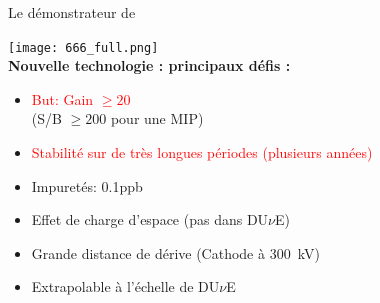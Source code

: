    \begin{frame}{Le démonstrateur de \SSS{}}
    	\begin{scriptsize}
                \centering
    			\texttt{[image: 666\_full.png]}\\
    			\vfill
    			\textbf{Nouvelle technologie : principaux défis :}\\
    			\begin{minipage}{0.32\textwidth}
    				\begin{itemize}
    					\item \textcolor{red}{But: Gain $\geq 20$} \\(S/B $\geq 200$ pour une MIP)
    					\item \textcolor{red}{Stabilité sur de très longues périodes (plusieurs années)}
    				\end{itemize}
    			\end{minipage}\hfill
    			\begin{minipage}{0.32\textwidth}
    				\begin{itemize}
    					\item Impuretés: 0.1\;ppb
    					\item Effet de charge d'espace
    					(pas dans DU$\nu$E)
    				\end{itemize}
	    		\end{minipage}\hfill
	    		\begin{minipage}{0.32\textwidth}
	    			\begin{itemize}
	    				\item Grande distance de dérive (Cathode à \SI{300}{\kilo\volt})
	    				\item Extrapolable à l'échelle de DU$\nu$E
	    			\end{itemize}
	    		\end{minipage}
    	\end{scriptsize} 
    \end{frame}

